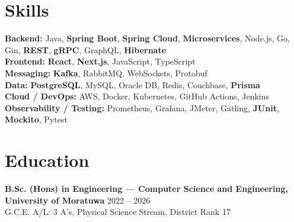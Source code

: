 \documentclass[a4paper,9pt]{extarticle}
\newcommand{\BigDivider}{}
\newcommand{\titleblock}[1]{%
  \begingroup
  \setlength{\fboxsep}{1pt}%
  \colorbox{BlockGray}{\strut\textbf{\textcolor{BlockText}{#1}}}%
  \endgroup
}
\newcommand{\kw}[1]{\textbf{#1}}
\newcommand{\skillhi}[1]{{\textbf{#1}}}
\newcommand{\cvprojectfull}[4]{%
  \noindent \titleblock{#1} \hfill {\scriptsize\textit{#2}} \\[0.15em]
  \begin{itemize}[leftmargin=*, itemsep=0pt, topsep=1pt, parsep=0pt]
    \item #3
    \item #4
  \end{itemize}
  \vspace{0.28em}
}
\begin{document}



\section*{Skills}
\BigDivider
\small
\noindent
\kw{Backend:} Java, \skillhi{Spring Boot}, \skillhi{Spring Cloud}, \skillhi{Microservices}, Node.js, Go, Gin, \skillhi{REST}, \skillhi{gRPC}, GraphQL, \skillhi{Hibernate}\\
\kw{Frontend:} \skillhi{React}, \skillhi{Next.js}, JavaScript, TypeScript\\
\kw{Messaging:} \skillhi{Kafka}, RabbitMQ, WebSockets, Protobuf\\
\kw{Data:} \skillhi{PostgreSQL}, MySQL, Oracle DB, Redis, Couchbase, \skillhi{Prisma}\\
\kw{Cloud / DevOps:} AWS, Docker, Kubernetes, GitHub Actions, Jenkins\\
\kw{Observability / Testing:} Prometheus, Grafana, JMeter, Gatling, \skillhi{JUnit}, \skillhi{Mockito}, Pytest
\normalsize
\vspace{0.15em}


\section*{Education}
\BigDivider
\noindent
\textbf{B.Sc. (Hons) in Engineering --- Computer Science and Engineering, University of Moratuwa}
\hfill 2022 -- 2026\\
G.C.E. A/L: 3 A's, Physical Science Stream, District Rank 17
\end{document}
